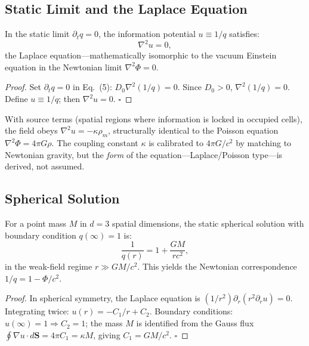 \documentclass[reprint]{revtex4-2}
\begin{document}
\subsection{Static Limit and the Laplace Equation}

\begin{theorem}
\label{thm:staticgravity}
In the static limit $\partial_t q=0$, the information potential $u\equiv 1/q$ satisfies:
\begin{equation}
\boxed{\nabla^2 u = 0},
\end{equation}
the Laplace equation---mathematically isomorphic to the vacuum Einstein equation in the Newtonian limit $\nabla^2\Phi=0$.
\end{theorem}
\begin{proof}
Set $\partial_t q=0$ in Eq.~(5): $D_0\nabla^2(1/q)=0$. Since $D_0>0$, $\nabla^2(1/q)=0$. Define $u\equiv 1/q$; then $\nabla^2 u=0$. $\square$
\end{proof}

With source terms (spatial regions where information is locked in occupied cells), the field obeys $\nabla^2 u = -\kappa\rho_m$, structurally identical to the Poisson equation $\nabla^2\Phi = 4\pi G\rho$. The coupling constant $\kappa$ is calibrated to $4\pi G/c^2$ by matching to Newtonian gravity, but the \emph{form} of the equation---Laplace/Poisson type---is derived, not assumed.

\subsection{Spherical Solution}

\begin{theorem}
\label{thm:spherical}
For a point mass $M$ in $d=3$ spatial dimensions, the static spherical solution with boundary condition $q(\infty)=1$ is:
\begin{equation}
\boxed{\frac{1}{q(r)} = 1 + \frac{GM}{rc^2}},
\end{equation}
in the weak-field regime $r\gg GM/c^2$. This yields the Newtonian correspondence $1/q = 1 - \Phi/c^2$.
\end{theorem}
\begin{proof}
In spherical symmetry, the Laplace equation is $(1/r^2)\partial_r(r^2\partial_r u)=0$. Integrating twice: $u(r) = -C_1/r + C_2$. Boundary conditions: $u(\infty)=1\Rightarrow C_2=1$; the mass $M$ is identified from the Gauss flux $\oint\nabla u\cdot d\mathbf{S} = 4\pi C_1 = \kappa M$, giving $C_1 = GM/c^2$. $\square$
\end{proof}
\end{document}
